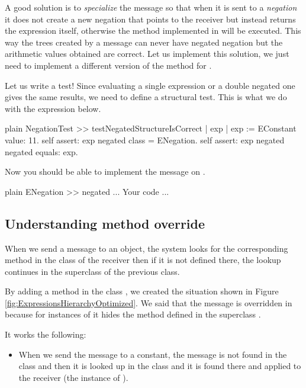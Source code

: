 \documentclass[10pt,twoside,english]{_support/latex/sbabook/sbabook}
\begin{document}
A good solution is to \textit{specialize} the message  so that when it is sent to a \textit{negation} it does not create a new negation that points to the receiver but instead returns the expression itself, otherwise the method implemented in  will be executed. This way the trees created by a  message can never have negated negation but the arithmetic values obtained are correct. Let us implement this solution, we just need to implement a different version of the method  for . 

Let us write a test! Since evaluating a single expression or a double negated one gives the same results, we need to define a structural test. This is what we do with the expression  below.

\begin{displaycode}{plain}
NegationTest >> testNegatedStructureIsCorrect
	| exp |
	exp := EConstant value: 11.
	self assert: exp negated class = ENegation. 
	self assert: exp negated negated equals: exp.
\end{displaycode}

Now you should be able to implement the  message on . 

\begin{displaycode}{plain}
ENegation >> negated
	... Your code ...
\end{displaycode}
\subsection{Understanding method override}
When we send a message to an object, the system looks for the corresponding method in the class of the receiver then if it is not defined there, the lookup continues in the superclass of the previous class. 

By adding a method in the class , we created the situation shown in Figure \ref{fig:ExpressionsHierarchyOptimized}. We said that the message  is overridden in  because for instances of  it hides the method defined in the superclass . 

It works the following:

\begin{itemize}
\item When we send the message  to a constant, the message is not found in the class  and then it is looked up in the class  and it is found there and applied to the receiver (the instance of ).
\end{itemize}
\end{document}
